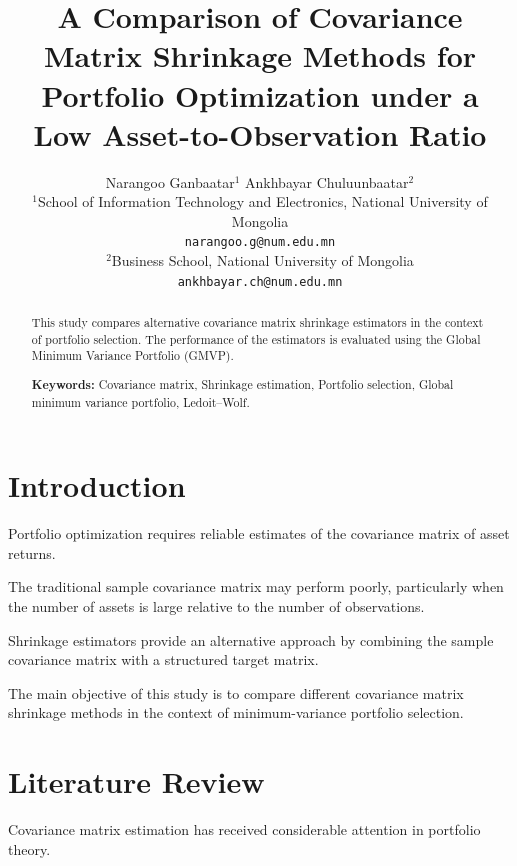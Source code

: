 \documentclass[12pt,a4paper]{article}
\title{
	\textbf{A Comparison of Covariance Matrix Shrinkage Methods for Portfolio Optimization under a Low Asset-to-Observation Ratio}
}
\author{
	Narangoo Ganbaatar$^{1}$ \qquad Ankhbayar Chuluunbaatar$^{2}$\\
	\small $^{1}$School of Information Technology and Electronics, National University of Mongolia\\
	\small \texttt{narangoo.g@num.edu.mn}\\
	\small $^{2}$Business School, National University of Mongolia\\
	\small \texttt{ankhbayar.ch@num.edu.mn}
}
\date{}
\date{}
\begin{document}
	
	\maketitle
	
	
	\begin{abstract}
		
		This study compares alternative covariance matrix shrinkage
		estimators in the context of portfolio selection.
		The performance of the estimators is evaluated using the
		Global Minimum Variance Portfolio (GMVP).
		
		\medskip
		
		\noindent
		\textbf{Keywords:}
		Covariance matrix,
		Shrinkage estimation,
		Portfolio selection,
		Global minimum variance portfolio,
		Ledoit--Wolf.
		
	\end{abstract}
	
	
	
	\section{Introduction}
	
	Portfolio optimization requires reliable estimates of the
	covariance matrix of asset returns.
	
	The traditional sample covariance matrix may perform poorly,
	particularly when the number of assets is large relative to
	the number of observations.
	
	Shrinkage estimators provide an alternative approach by
	combining the sample covariance matrix with a structured
	target matrix.
	
	The main objective of this study is to compare different
	covariance matrix shrinkage methods in the context of
	minimum-variance portfolio selection.
	
	
	
	\section{Literature Review}
	
	Covariance matrix estimation has received considerable
	attention in portfolio theory.
	
\end{document}
